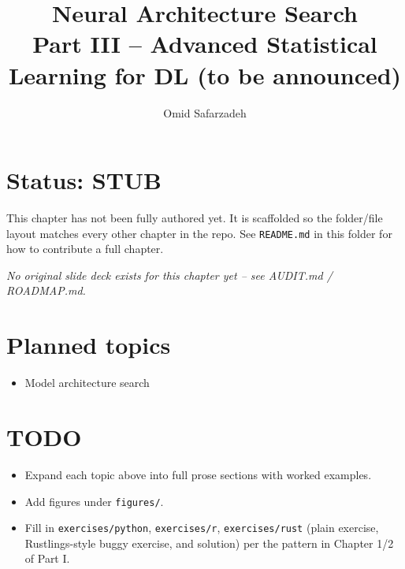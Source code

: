 \documentclass[11pt]{article}
\title{Neural Architecture Search \\ \large Part III -- Advanced Statistical Learning for DL (to be announced)}
\author{Omid Safarzadeh}
\date{}
\begin{document}
\maketitle

\section*{Status: STUB}
This chapter has not been fully authored yet. It is scaffolded so the
folder/file layout matches every other chapter in the repo. See
\texttt{README.md} in this folder for how to contribute a full chapter.

\textit{No original slide deck exists for this chapter yet -- see AUDIT.md / ROADMAP.md.}



\section*{Planned topics}
\begin{itemize}
  \item Model architecture search
\end{itemize}

\section*{TODO}
\begin{itemize}
  \item Expand each topic above into full prose sections with worked examples.
  \item Add figures under \texttt{figures/}.
  \item Fill in \texttt{exercises/python}, \texttt{exercises/r}, \texttt{exercises/rust}
        (plain exercise, Rustlings-style buggy exercise, and solution) per the
        pattern in Chapter 1/2 of Part I.
\end{itemize}
\end{document}
